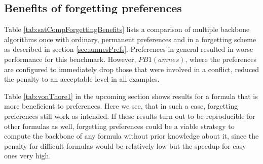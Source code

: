 \subsection{Benefits of forgetting preferences}
Table \ref{tab:satCompForgettingBenefits}
lists a comparison of multiple backbone algorithms once with ordinary, permanent preferences and in a forgetting scheme as described in section \ref{sec:amnesPrefs}. Preferences in general resulted in worse performance for this benchmark. However, $PB1(amnes)$, where the preferences are configured to immediately drop those that were involved in a conflict, reduced the penalty to an acceptable level in all examples. 


Table \ref{tab:vonThore1} in the upcoming section shows results for a formula that is more beneficient to preferences. Here we see, that in such a case, forgetting preferences still work as intended. If these results turn out to be reproducible for other formulas as well, forgetting preferences could be a viable strategy to compute the backbone of any formula without prior knowledge about it, since the penalty for difficult formulas would be relatively low but the speedup for easy ones very high.


